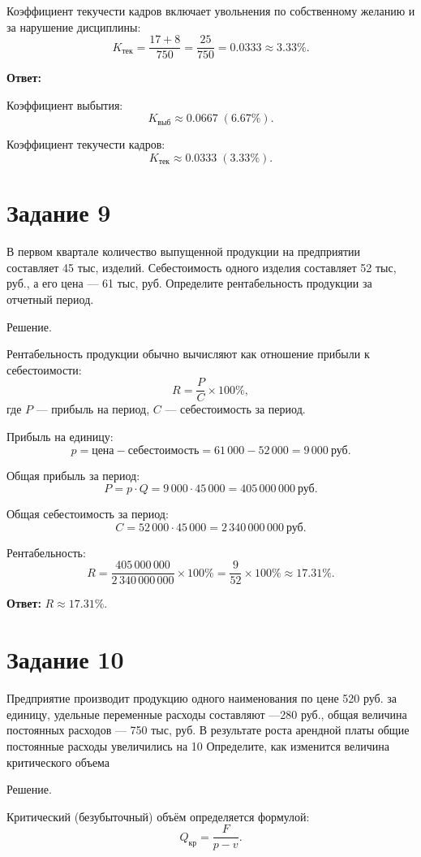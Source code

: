 \documentclass[14pt,a4paper]{extarticle}
\begin{document}
Коэффициент текучести кадров включает увольнения по собственному желанию и за нарушение дисциплины:
\[
K_{\text{тек}} = \frac{17 + 8}{750} = \frac{25}{750} = 0.0333 \approx 3.33\%.
\]

\textbf{Ответ:}

Коэффициент выбытия:
\[
K_{\text{выб}} \approx 0.0667 \; (6.67\%).
\]

Коэффициент текучести кадров:
\[
K_{\text{тек}} \approx 0.0333 \; (3.33\%).
\]

\section{Задание 9}
В первом квартале количество выпущенной продукции на предприятии составляет
45 тыс, изделий. Себестоимость одного изделия составляет 52 тыс, руб., а его цена — 61
тыс, руб. Определите рентабельность продукции за отчетный период.

Решение.

Рентабельность продукции обычно вычисляют как отношение прибыли к себестоимости:
\[
R = \frac{P}{C}\times 100\%,
\]
где $P$ --- прибыль на период, $C$ --- себестоимость за период.

Прибыль на единицу:
\[
p = \text{цена} - \text{себестоимость} = 61\,000 - 52\,000 = 9\,000\ \text{руб.}
\]

Общая прибыль за период:
\[
P = p \cdot Q = 9\,000 \cdot 45\,000 = 405\,000\,000\ \text{руб.}
\]

Общая себестоимость за период:
\[
C = 52\,000 \cdot 45\,000 = 2\,340\,000\,000\ \text{руб.}
\]

Рентабельность:
\[
R = \frac{405\,000\,000}{2\,340\,000\,000}\times100\% = \frac{9}{52}\times100\% \approx 17.31\%.
\]

\textbf{Ответ:} $R \approx 17.31\%$.

\section{Задание 10}
Предприятие производит продукцию одного наименования по цене 520 руб. за
единицу, удельные переменные расходы составляют —280 руб., общая величина
постоянных расходов — 750 тыс, руб. В результате роста арендной платы общие
постоянные расходы увеличились на 10 %
Определите, как изменится величина критического объема

Решение.

Критический (безубыточный) объём определяется формулой:
\[
Q_{\text{кр}}=\frac{F}{p-v}.
\]
\end{document}
